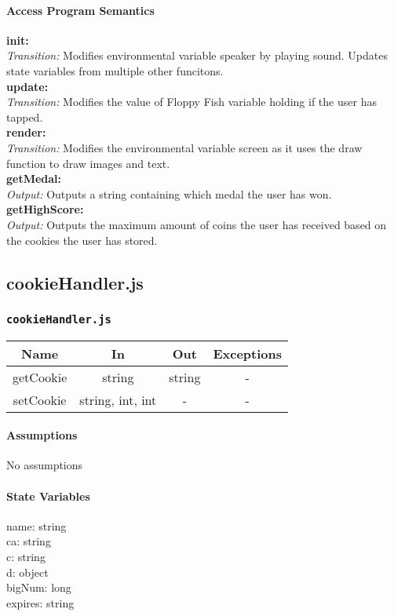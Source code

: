 \documentclass[11pt, oneside]{article}   	%
\begin{document}
\paragraph{Access Program Semantics} 
 \textbf{init:}  \\
 \textit{Transition:} Modifies environmental variable speaker by playing sound. Updates state variables from multiple other funcitons.\\
 \textbf{update:}  \\
 \textit{Transition:} Modifies the value of Floppy Fish variable holding if the user has tapped.\\
 \textbf{render:}  \\
 \textit{Transition:} Modifies the environmental variable screen as it uses the draw function to draw images and text.\\
 \textbf{getMedal:}  \\
 \textit{Output:} Outputs a string containing which medal the user has won.\\
 \textbf{getHighScore:}  \\
 \textit{Output:} Outputs the maximum amount of coins the user has received based on the cookies the user has stored.\\



\subsection{cookieHandler.js}
\subsubsection{\texttt{cookieHandler.js}}
\begin{center}
\begin{tabular}{ |c|c|c|c| } 
 \hline
 Name & In & Out & Exceptions \\ 
 \hline \hline
 getCookie & string & string & - \\ 
 setCookie & string, int, int & - & - \\ 
 \hline
\end{tabular}
\end{center}

\paragraph{Assumptions}
No assumptions

\paragraph{State Variables}
name: string\\
ca: string\\
c: string\\
d: object\\
bigNum: long\\
expires: string\\
\end{document}
